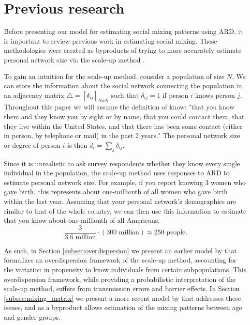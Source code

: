 \section{Previous research}
\label{sec:kernel_previous_research}

Before presenting our model for estimating social mixing patterns using ARD, it is important to review previous work in estimating social mixing. These methodologies were created as byproducts of trying to more accurately estimate personal network size via the scale-up method \citep{Killworth+others:1998}.

To gain an intuition for the scale-up method, consider a population of size $N$. We can store the information about the social network connecting the population in an adjacency matrix $\triangle = [\delta_{ij}]_{NxN}$ such that $\delta_{ij} = 1$ if person $i$ knows person $j$. Throughout this paper we will assume the \citet{McCarty+others:2001} definition of know: "that you know them and they know you by sight or by name, that you could contact them, that they live within the United States, and that there has been some contact (either in person, by telephone or mail) in the past 2 years." The personal network size or degree of person $i$ is then $d_i =  \sum_j \delta_{ij}$.

Since it is unrealistic to ask survey respondents whether they know every single individual in the population, the \citet{Killworth+others:1998} scale-up method uses responses to ARD to estimate personal network size. For example, if you report knowing 3 women who gave birth, this represents about one-millionth of all women who gave birth within the last year. Assuming that your personal network's demographics are similar to that of the whole country, we can then use this information to estimate that you know about one-millionth of all Americans,
\begin{equation}
\frac{3}{3.6 \text{ million}} \cdot (300 \text{ million}) \approx 250 \text{ people}. 
\end{equation} 

As such, in Section \ref{subsec:overdispersion} we present an earlier model by \citet{Zheng+others:2006} that formalizes an overdispersion framework of the scale-up method, accounting for the variation in propensity to know individuals from certain subpopulations. This overdispersion framework, while providing a probabilistic interpretation of the scale-up method, suffers from transmission errors and barrier effects. In Section \ref{subsec:mixing_matrix} we present a more recent model by \citet{McCormick+others:2010} that addresses these issues, and as a byproduct allows estimation of the mixing patterns between age and gender groups.

